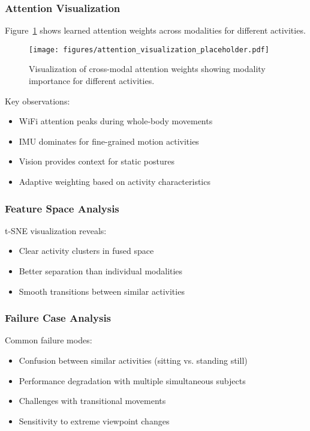 \documentclass[journal]{IEEEtran}
\begin{document}
\subsubsection{Attention Visualization}

Figure~\ref{fig:attention_vis} shows learned attention weights across modalities for different activities.

\begin{figure}[t]
\centering
\texttt{[image: figures/attention\_visualization\_placeholder.pdf]}
\caption{Visualization of cross-modal attention weights showing modality importance for different activities.}
\label{fig:attention_vis}
\end{figure}

Key observations:
\begin{itemize}
\item WiFi attention peaks during whole-body movements
\item IMU dominates for fine-grained motion activities
\item Vision provides context for static postures
\item Adaptive weighting based on activity characteristics
\end{itemize}

\subsubsection{Feature Space Analysis}

t-SNE visualization reveals:
\begin{itemize}
\item Clear activity clusters in fused space
\item Better separation than individual modalities
\item Smooth transitions between similar activities
\end{itemize}

\subsubsection{Failure Case Analysis}

Common failure modes:
\begin{itemize}
\item Confusion between similar activities (sitting vs. standing still)
\item Performance degradation with multiple simultaneous subjects
\item Challenges with transitional movements
\item Sensitivity to extreme viewpoint changes
\end{itemize}
\end{document}
